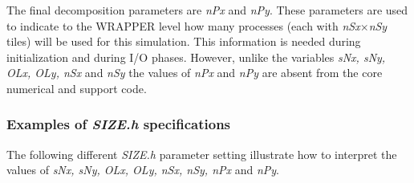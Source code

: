  The final decomposition parameters are {\em nPx} and {\em nPy}. These parameters
are used to indicate to the WRAPPER level how many processes (each with
{\em nSx}$\times${\em nSy} tiles) will be used for this simulation. 
This information is needed during initialization and during I/O phases.
However, unlike the variables {\em sNx, sNy, OLx, OLy, nSx} and {\em nSy}
the values of {\em nPx} and {\em nPy} are absent
from the core numerical and support code.

\subsubsection{Examples of {\em SIZE.h} specifications}

The following different {\em SIZE.h} parameter setting illustrate how to
interpret the values of {\em sNx, sNy, OLx, OLy, nSx, nSy, nPx}
and {\em nPy}.
